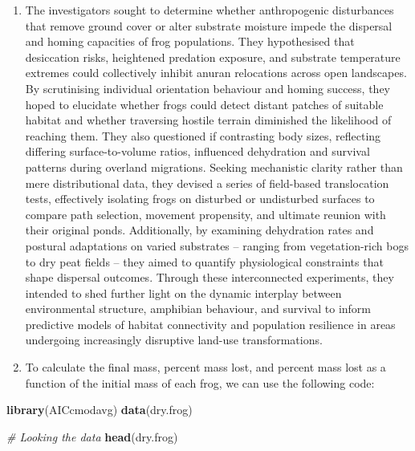 \documentclass[
  10t,
]{article}
\newenvironment{Shaded}{\begin{snugshade}}{\end{snugshade}}
\newcommand{\CommentTok}[1]{\textcolor[rgb]{0.56,0.35,0.01}{\textit{#1}}}
\newcommand{\FunctionTok}[1]{\textcolor[rgb]{0.13,0.29,0.53}{\textbf{#1}}}
\newcommand{\NormalTok}[1]{#1}
\begin{document}
\begin{enumerate}
\def\labelenumi{\alph{enumi}.}
\item
  The investigators sought to determine whether anthropogenic
  disturbances that remove ground cover or alter substrate moisture
  impede the dispersal and homing capacities of frog populations. They
  hypothesised that desiccation risks, heightened predation exposure,
  and substrate temperature extremes could collectively inhibit anuran
  relocations across open landscapes. By scrutinising individual
  orientation behaviour and homing success, they hoped to elucidate
  whether frogs could detect distant patches of suitable habitat and
  whether traversing hostile terrain diminished the likelihood of
  reaching them. They also questioned if contrasting body sizes,
  reflecting differing surface-to-volume ratios, influenced dehydration
  and survival patterns during overland migrations. Seeking mechanistic
  clarity rather than mere distributional data, they devised a series of
  field-based translocation tests, effectively isolating frogs on
  disturbed or undisturbed surfaces to compare path selection, movement
  propensity, and ultimate reunion with their original ponds.
  Additionally, by examining dehydration rates and postural adaptations
  on varied substrates -- ranging from vegetation-rich bogs to dry peat
  fields -- they aimed to quantify physiological constraints that shape
  dispersal outcomes. Through these interconnected experiments, they
  intended to shed further light on the dynamic interplay between
  environmental structure, amphibian behaviour, and survival to inform
  predictive models of habitat connectivity and population resilience in
  areas undergoing increasingly disruptive land-use transformations.
\item
  To calculate the final mass, percent mass lost, and percent mass lost
  as a function of the initial mass of each frog, we can use the
  following code:
\end{enumerate}

\begin{Shaded}
\begin{Highlighting}[]
\FunctionTok{library}\NormalTok{(AICcmodavg)}
\FunctionTok{data}\NormalTok{(dry.frog)}

\CommentTok{\# Looking the data}
\FunctionTok{head}\NormalTok{(dry.frog)}
\end{Highlighting}
\end{Shaded}
\end{document}
